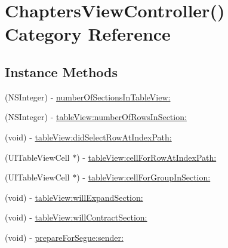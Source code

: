 \hypertarget{category_chapters_view_controller_07_08}{\section{Chapters\-View\-Controller() Category Reference}
\label{category_chapters_view_controller_07_08}
}
\subsection*{Instance Methods}
\begin{DoxyCompactItemize}
\item 
(N\-S\-Integer) -\/ \hyperlink{category_chapters_view_controller_07_08_a7d7eccfc6e393f629455e2aab3baf218}{number\-Of\-Sections\-In\-Table\-View\-:}
\item 
(N\-S\-Integer) -\/ \hyperlink{category_chapters_view_controller_07_08_a95ab76e8d2c9a7db4fc57a25b26a71a2}{table\-View\-:number\-Of\-Rows\-In\-Section\-:}
\item 
(void) -\/ \hyperlink{category_chapters_view_controller_07_08_a6e6822ccc5ea2465fc76b94dc6175447}{table\-View\-:did\-Select\-Row\-At\-Index\-Path\-:}
\item 
(U\-I\-Table\-View\-Cell $\ast$) -\/ \hyperlink{category_chapters_view_controller_07_08_a5580b68cfd6bd4662769e4ebc4a7b0b4}{table\-View\-:cell\-For\-Row\-At\-Index\-Path\-:}
\item 
(U\-I\-Table\-View\-Cell $\ast$) -\/ \hyperlink{category_chapters_view_controller_07_08_a299188971e0b5956d7444935be1bcb9f}{table\-View\-:cell\-For\-Group\-In\-Section\-:}
\item 
(void) -\/ \hyperlink{category_chapters_view_controller_07_08_a63f3ca5443908852bdd17b3e45424a58}{table\-View\-:will\-Expand\-Section\-:}
\item 
(void) -\/ \hyperlink{category_chapters_view_controller_07_08_a7fa6aa1c36f2e4b183faae639733326c}{table\-View\-:will\-Contract\-Section\-:}
\item 
(void) -\/ \hyperlink{category_chapters_view_controller_07_08_a4aa5119dce377ab8b3589ca904710908}{prepare\-For\-Segue\-:sender\-:}
\end{DoxyCompactItemize}


